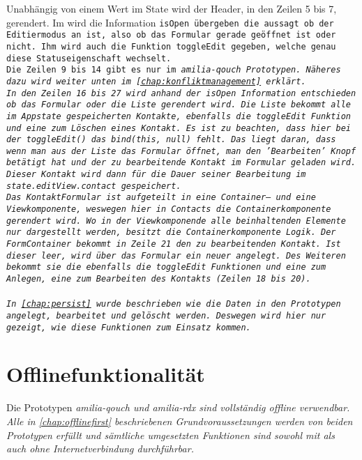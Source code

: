 %
\begin{center}
  
\end{center}
%
Unabhängig von einem Wert im State wird der Header, in den Zeilen 5 bis 7, gerendert.
Im wird die Information \tt{isOpen} übergeben die aussagt ob der Editiermodus an ist, also ob das Formular gerade geöffnet ist oder nicht.
Ihm wird auch die Funktion \tt{toggleEdit} gegeben, welche genau diese Statuseigenschaft wechselt.\\
Die Zeilen 9 bis 14 gibt es nur im \it{amilia-qouch} Prototypen. Näheres dazu wird weiter unten im \autoref{chap:konfliktmanagement} erklärt.\\
In den Zeilen 16 bis 27 wird anhand der \tt{isOpen} Information entschieden ob das Formular oder die Liste gerendert wird.
Die Liste bekommt alle im \gls{App}state gespeicherten Kontakte, ebenfalls die \tt{toggleEdit} Funktion und eine zum Löschen eines Kontakt. Es ist zu beachten, dass hier bei der \tt{toggleEdit()} das \tt{bind(this, null)} fehlt. Das liegt daran, dass wenn man aus der Liste das Formular öffnet, man den 'Bearbeiten' Knopf betätigt hat und der zu bearbeitende Kontakt im Formular geladen wird. Dieser Kontakt wird dann für die Dauer seiner Bearbeitung im \tt{state.editView.contact} gespeichert.\\
Das KontaktFormular ist aufgeteilt in eine Container-- und eine Viewkomponente, weswegen hier in \tt{Contacts} die Containerkomponente gerendert wird.
Wo in der Viewkomponende alle beinhaltenden Elemente nur dargestellt werden, besitzt die Containerkomponente Logik.
Der \tt{FormContainer} bekommt in Zeile 21 den zu bearbeitenden Kontakt. Ist dieser leer, wird über das Formular ein neuer angelegt.
Des Weiteren bekommt sie die ebenfalls die \tt{toggleEdit} Funktionen und eine zum Anlegen, eine zum Bearbeiten des Kontakts (Zeilen 18 bis 20).\\\\
In \autoref{chap:persist} wurde beschrieben wie die Daten in den Prototypen angelegt, bearbeitet und gelöscht werden. Deswegen wird hier nur gezeigt, wie diese Funktionen zum Einsatz kommen.


%
%
%
\section{Offlinefunktionalität}
Die Prototypen \it{amilia-qouch} und \it{amilia-rdx} sind vollständig offline verwendbar.
Alle in \autoref{chap:offlinefirst} beschriebenen Grundvoraussetzungen werden von beiden Prototypen erfüllt und sämtliche umgesetzten Funktionen sind sowohl mit als auch ohne Internetverbindung durchführbar.
%

%
%
%
